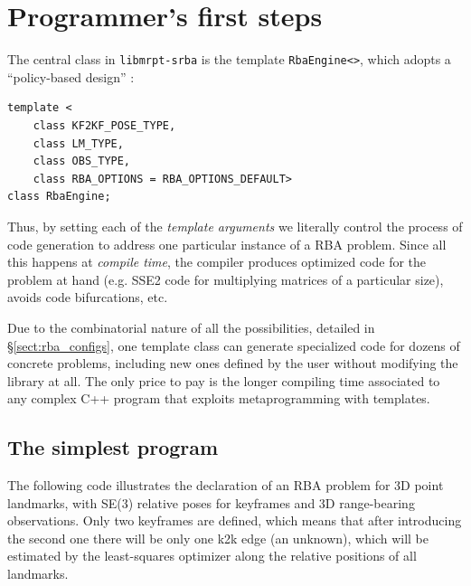 \documentclass[a4paper,11pt]{article}
\begin{document}
\newpage


\section{Programmer's first steps}
\label{sect:program_first}

The central class in \texttt{libmrpt-srba} is the template \texttt{RbaEngine<>}, which 
adopts a ``policy-based design'' \cite{andrei2001modern}:

\begin{lstlisting}
template <
	class KF2KF_POSE_TYPE,
	class LM_TYPE,
	class OBS_TYPE, 
	class RBA_OPTIONS = RBA_OPTIONS_DEFAULT>
class RbaEngine;
\end{lstlisting}

Thus, by setting each of the \emph{template arguments} we literally control the process 
of code generation to address one particular instance of a RBA problem. 
Since all this happens at \emph{compile time}, the compiler produces optimized code for 
the problem at hand (e.g. SSE2 code for multiplying matrices of a particular size), 
avoids code bifurcations, etc.

Due to the combinatorial nature of all the possibilities, 
detailed in \S\ref{sect:rba_configs}, one template class 
can generate specialized code for dozens of concrete problems, 
including new ones defined by the user without modifying the library at all.
The only price to pay is the longer compiling time associated to any complex C++ program 
that exploits metaprogramming with templates.


\subsection{The simplest program}

The following code illustrates the declaration of an RBA problem for 3D point landmarks, 
with SE(3) relative poses for keyframes and 3D range-bearing observations. 
Only two keyframes are defined, which means that after introducing the second one
there will be only one k2k edge (an unknown), which will be estimated by the least-squares 
optimizer along the relative positions of all landmarks.
\end{document}
